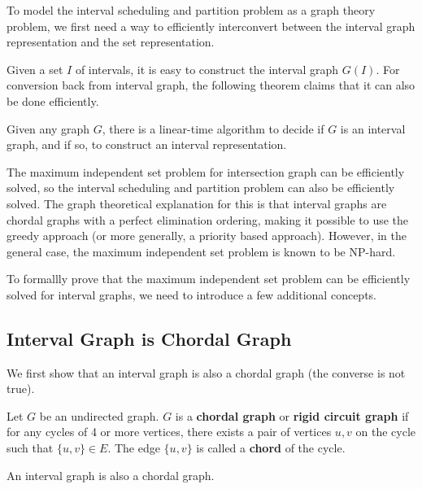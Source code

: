 To model the interval scheduling and partition problem as a graph theory problem, we first need a way to efficiently interconvert between the interval graph representation and the set representation.

Given a set $I$ of intervals, it is easy to construct the interval graph $G(I)$. For conversion back from interval graph, the following theorem claims that it can also be done efficiently.

\begin{theorem}
    Given any graph $G$, there is a linear-time algorithm to decide if $G$ is an interval graph, and if so, to construct an interval representation.
\end{theorem}

The maximum independent set problem for intersection graph can be efficiently solved, so the interval scheduling and partition problem can also be efficiently solved. The graph theoretical explanation for this is that interval graphs are chordal graphs with a perfect elimination ordering, making it possible to use the greedy approach (or more generally, a priority based approach). However, in the general case, the maximum independent set problem is known to be NP-hard.

To formallly prove that the maximum independent set problem can be efficiently solved for interval graphs, we need to introduce a few additional concepts.

\subsection{Interval Graph is Chordal Graph}

We first show that an interval graph is also a chordal graph (the converse is not true).

\begin{definition}   
    Let $G$ be an undirected graph. $G$ is a \textbf{chordal graph} or \textbf{rigid circuit graph} if for any cycles of 4 or more vertices, there exists a pair of vertices $u,v$ on the cycle such that $\{u,v\} \in E$. The edge $\{u,v\}$ is called a \textbf{chord} of the cycle.
\end{definition}

\vspace{\parskip}

\begin{theorem}
    An interval graph is also a chordal graph.
\end{theorem}

